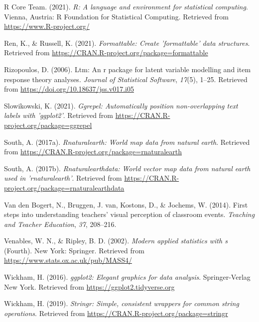\documentclass[
  man]{apa6}
\newlength{\cslhangindent}
\newlength{\cslentryspacingunit} %
\newenvironment{CSLReferences}[2] %
 {%
  \setlength{\parindent}{0pt}
  \ifodd #1
  \let\oldpar\par
  \def\par{\hangindent=\cslhangindent\oldpar}
  \fi
  \setlength{\parskip}{#2\cslentryspacingunit}
 }%
 {}
\begin{document}
\begin{CSLReferences}{1}{0}
\leavevmode{}%
R Core Team. (2021). \emph{R: A language and environment for statistical computing}. Vienna, Austria: R Foundation for Statistical Computing. Retrieved from \url{https://www.R-project.org/}

\leavevmode{}%
Ren, K., \& Russell, K. (2021). \emph{Formattable: Create 'formattable' data structures}. Retrieved from \url{https://CRAN.R-project.org/package=formattable}

\leavevmode{}%
Rizopoulos, D. (2006). Ltm: An r package for latent variable modelling and item response theory analyses. \emph{Journal of Statistical Software}, \emph{17}(5), 1--25. Retrieved from \url{https://doi.org/10.18637/jss.v017.i05}

\leavevmode{}%
Slowikowski, K. (2021). \emph{Ggrepel: Automatically position non-overlapping text labels with 'ggplot2'}. Retrieved from \url{https://CRAN.R-project.org/package=ggrepel}

\leavevmode{}%
South, A. (2017a). \emph{Rnaturalearth: World map data from natural earth}. Retrieved from \url{https://CRAN.R-project.org/package=rnaturalearth}

\leavevmode{}%
South, A. (2017b). \emph{Rnaturalearthdata: World vector map data from natural earth used in 'rnaturalearth'}. Retrieved from \url{https://CRAN.R-project.org/package=rnaturalearthdata}

\leavevmode{}%
Van den Bogert, N., Bruggen, J. van, Kostons, D., \& Jochems, W. (2014). First steps into understanding teachers' visual perception of classroom events. \emph{Teaching and Teacher Education}, \emph{37}, 208--216.

\leavevmode{}%
Venables, W. N., \& Ripley, B. D. (2002). \emph{Modern applied statistics with s} (Fourth). New York: Springer. Retrieved from \url{https://www.stats.ox.ac.uk/pub/MASS4/}

\leavevmode{}%
Wickham, H. (2016). \emph{ggplot2: Elegant graphics for data analysis}. Springer-Verlag New York. Retrieved from \url{https://ggplot2.tidyverse.org}

\leavevmode{}%
Wickham, H. (2019). \emph{Stringr: Simple, consistent wrappers for common string operations}. Retrieved from \url{https://CRAN.R-project.org/package=stringr}


\end{CSLReferences}
\end{document}
